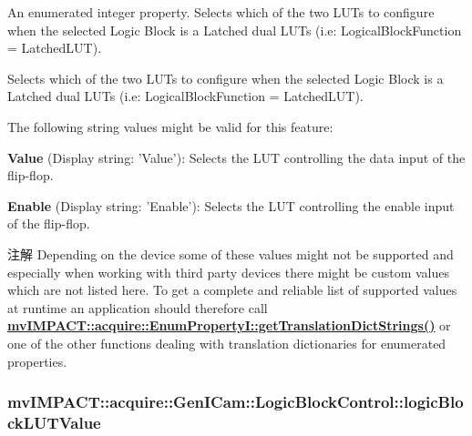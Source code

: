An enumerated integer property. Selects which of the two L\+U\+Ts to configure when the selected Logic Block is a Latched dual L\+U\+Ts (i.\+e\+: Logical\+Block\+Function = Latched\+L\+U\+T). 

Selects which of the two L\+U\+Ts to configure when the selected Logic Block is a Latched dual L\+U\+Ts (i.\+e\+: Logical\+Block\+Function = Latched\+L\+U\+T).

The following string values might be valid for this feature\+:
\begin{DoxyItemize}
\item {\bfseries Value} (Display string\+: 'Value')\+: Selects the L\+U\+T controlling the data input of the flip-\/flop.
\item {\bfseries Enable} (Display string\+: 'Enable')\+: Selects the L\+U\+T controlling the enable input of the flip-\/flop.
\end{DoxyItemize}

\begin{DoxyNote}{注解}
Depending on the device some of these values might not be supported and especially when working with third party devices there might be custom values which are not listed here. To get a complete and reliable list of supported values at runtime an application should therefore call {\bfseries \hyperlink{classmv_i_m_p_a_c_t_1_1acquire_1_1_enum_property_i_a0ba6ccbf5ee69784d5d0b537924d26b6}{mv\+I\+M\+P\+A\+C\+T\+::acquire\+::\+Enum\+Property\+I\+::get\+Translation\+Dict\+Strings()}} or one of the other functions dealing with translation dictionaries for enumerated properties. 
\end{DoxyNote}
\hypertarget{classmv_i_m_p_a_c_t_1_1acquire_1_1_gen_i_cam_1_1_logic_block_control_aa15ad3405272a9eef1d70be5d3594b93}{
\subsubsection[{logic\+Block\+L\+U\+T\+Value}]{ mv\+I\+M\+P\+A\+C\+T\+::acquire\+::\+Gen\+I\+Cam\+::\+Logic\+Block\+Control\+::logic\+Block\+L\+U\+T\+Value}}\label{classmv_i_m_p_a_c_t_1_1acquire_1_1_gen_i_cam_1_1_logic_block_control_aa15ad3405272a9eef1d70be5d3594b93}


